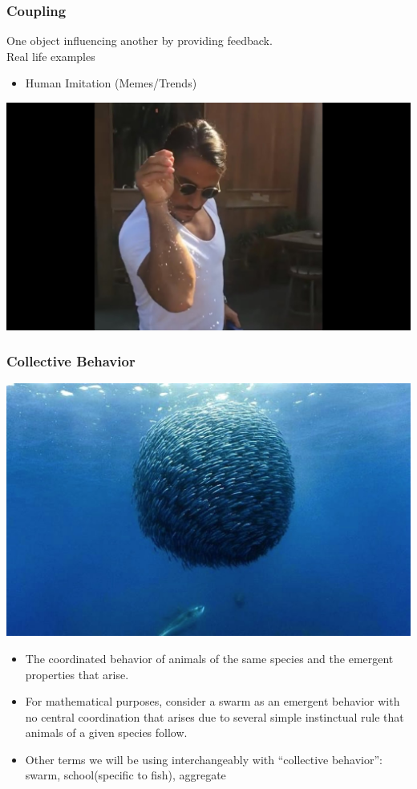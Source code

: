 \documentclass[xcolor=dvipsnames]{beamer}
\begin{document}
\begin{frame}
	\frametitle{Coupling}	
	One object influencing another by providing feedback. \\
	Real life examples
	\begin{itemize}
		\item Human Imitation (Memes/Trends)
	\end{itemize}
	\begin{center}
	\includegraphics[scale=0.15]{images/salt_guy.jpg}
	\end{center}
\end{frame}

\begin{frame}
	\frametitle{Collective Behavior}
	\begin{center}
	\includegraphics[scale=0.05]{images/fish_schoo.jpg}
	\end{center}
	\begin{itemize}
		\item The coordinated behavior of animals of the same species and the emergent properties that arise.
		\pause
		\item For mathematical purposes, consider a swarm as an emergent behavior with no central coordination that arises due to several simple instinctual rule that animals of a given species follow.
		\pause
		\item Other terms we will be using interchangeably with ``collective behavior'': swarm, school(specific to fish), aggregate
	\end{itemize}
\end{frame}
\end{document}

